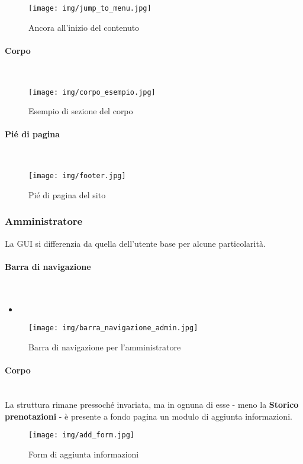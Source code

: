 \begin{figure}[h!]
	\centerline{\texttt{[image: img/jump\_to\_menu.jpg]}}
	\caption{Ancora all'inizio del contenuto}
	\label{fig:anchor}
\end{figure}
\paragraph{Corpo}
~\\

\begin{figure}[h!]
	\centerline{\texttt{[image: img/corpo\_esempio.jpg]}}
	\caption{Esempio di sezione del corpo}
	\label{fig:corpoGU}
\end{figure}
\paragraph{Pié di pagina}
~\\

\begin{figure}[h!]
	\centerline{\texttt{[image: img/footer.jpg]}}
	\caption{Pié di pagina del sito}
	\label{fig:footer}
\end{figure}
\subsubsection{Amministratore}
La GUI si differenzia da quella dell'utente base per alcune particolarità.
\paragraph{Barra di navigazione}
~\\
\begin{itemize}
	\item \textbf{}
\end{itemize}

\begin{figure}[h!]
	\centerline{\texttt{[image: img/barra\_navigazione\_admin.jpg]}}
	\caption{Barra di navigazione per l'amministratore}
	\label{fig:navbarAD}
\end{figure}
\paragraph{Corpo}
~\\La struttura rimane pressoché invariata, ma in ognuna di esse - meno la \textbf{Storico prenotazioni} - è presente a fondo pagina un modulo di aggiunta informazioni.
\begin{figure}[h!]
	\centerline{\texttt{[image: img/add\_form.jpg]}}
	\caption{Form di aggiunta informazioni}
	\label{fig:addForm}
\end{figure}
